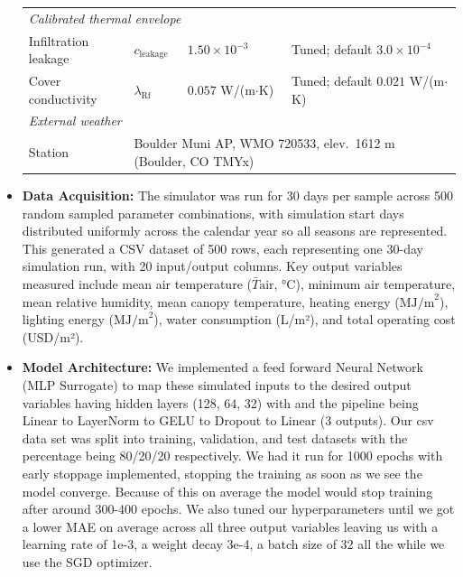 \documentclass{article}
\begin{document}
\begin{itemize}
\begin{table}[h]
\begin{tabular}{llll}
    
      \multicolumn{4}{l}{\textit{Calibrated thermal envelope}} \\
        Infiltration leakage & $c_{\text{leakage}}$ & $1.50 \times 10^{-3}$ & Tuned; default $3.0 \times 10^{-4}$ \\
        Cover conductivity   & $\lambda_{\text{Rf}}$ & $0.057$ W/(m$\cdot$K) & Tuned; default $0.021$ W/(m$\cdot$K) \\
        \hline                                                                                                                           
      \multicolumn{4}{l}{\textit{External weather}} \\                                                                                    
      Station & \multicolumn{3}{l}{Boulder Muni AP, WMO 720533, elev.\ 1612 m (Boulder, CO TMYx)} \\                                     
      \hline                                                                                                                             
      \end{tabular}                                                                                                                      
      \end{table}   
    \item \textbf{Data Acquisition:} The simulator was run for 30 days per sample across 500 random sampled parameter combinations, with simulation start days distributed uniformly across the calendar year so all seasons are represented. This generated a CSV dataset of 500 rows, each representing one 30-day simulation run, with 20 input/output columns. Key output variables measured include mean air temperature ($\bar{T}{\text{air}}$, °C), minimum air temperature, mean relative humidity, mean canopy temperature, heating energy ($\text{MJ/m}^2$), lighting energy ($\text{MJ/m}^2$), water consumption (L/m²), and total operating cost (USD/m²).
    \item \textbf{Model Architecture:} We implemented a feed forward Neural Network (MLP Surrogate) to map these simulated inputs to the desired output variables having hidden layers (128, 64, 32) with and the pipeline being Linear to LayerNorm to GELU to Dropout to Linear (3 outputs). Our csv data set was split into training, validation, and test datasets with the percentage being 80/20/20 respectively. We had it run for 1000 epochs with early stoppage implemented, stopping the training as soon as we see the model converge. Because of this on average the model would stop training after around 300-400 epochs. We also tuned our hyperparameters until we got a lower MAE on average across all three output variables leaving us with a learning rate of 1e-3, a weight decay 3e-4, a batch size of 32 all the while we use the SGD optimizer. 

\end{itemize}
\end{document}
